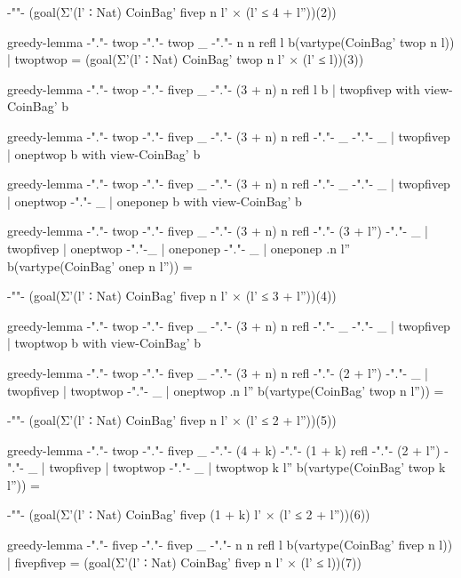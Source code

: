 \begin{sidewaysfigure}
\begin{code}
{-"\hfill"-} (goal(Σ'(l' ∶ Nat) CoinBag' fivep n l' × (l' ≤ 4 + l''))(2))

greedy-lemma {-"."-}  twop   {-"."-}  twop   _    {-"."-}  n                n        refl           l                   b(vartype(CoinBag' twop n l))  | twoptwop = (goal(Σ'(l' ∶ Nat) CoinBag' twop n l' × (l' ≤ l))(3))

greedy-lemma {-"."-}  twop   {-"."-}  fivep  _    {-"."-}  (3 + n)          n        refl           l                   b  | twopfivep  with view-CoinBag' b

greedy-lemma {-"."-}  twop   {-"."-}  fivep  _    {-"."-}  (3 + n)          n        refl  {-"."-}  _          {-"."-}  _  | twopfivep  | oneptwop          b  with view-CoinBag' b

greedy-lemma {-"."-}  twop   {-"."-}  fivep  _    {-"."-}  (3 + n)          n        refl  {-"."-}  _          {-"."-}  _  | twopfivep  | oneptwop {-"."-}  _  | oneponep        b  with view-CoinBag' b

greedy-lemma {-"."-}  twop   {-"."-}  fivep  _    {-"."-}  (3 + n)          n        refl  {-"."-}  (3 + l'')  {-"."-}  _  | twopfivep  | oneptwop {-"."-}_  | oneponep {-"."-}  _  | oneponep {.n} {l''} b(vartype(CoinBag' onep n l'')) =

{-"\hfill"-} (goal(Σ'(l' ∶ Nat) CoinBag' fivep n l' × (l' ≤ 3 + l''))(4))

greedy-lemma {-"."-}  twop   {-"."-}  fivep  _    {-"."-}  (3 + n)          n        refl  {-"."-}  _          {-"."-}  _  | twopfivep  | twoptwop          b  with view-CoinBag' b

greedy-lemma {-"."-}  twop   {-"."-}  fivep  _    {-"."-}  (3 + n)          n        refl  {-"."-}  (2 + l'')  {-"."-}  _  | twopfivep  | twoptwop {-"."-}  _  | oneptwop {.n}  {l''} b(vartype(CoinBag' twop n l'')) =

{-"\hfill"-} (goal(Σ'(l' ∶ Nat) CoinBag' fivep n l' × (l' ≤ 2 + l''))(5))

greedy-lemma {-"."-}  twop   {-"."-}  fivep  _    {-"."-}  (4 + k) {-"."-}  (1 + k)  refl  {-"."-}  (2 + l'')  {-"."-}  _  | twopfivep  | twoptwop {-"."-}  _  | twoptwop {k}   {l''} b(vartype(CoinBag' twop k l'')) =

{-"\hfill"-} (goal(Σ'(l' ∶ Nat) CoinBag' fivep (1 + k) l' × (l' ≤ 2 + l''))(6))

greedy-lemma {-"."-}  fivep  {-"."-}  fivep  _    {-"."-}  n                n        refl           l                   b(vartype(CoinBag' fivep n l))  | fivepfivep = (goal(Σ'(l' ∶ Nat) CoinBag' fivep n l' × (l' ≤ l))(7))
\end{code}
\vskip-10pt
\caption{Cases of |greedy-lemma|, generated semi-automatically by \Agda's interactive case-split mechanism.
Goal types are shown in the interaction points, and the types of some pattern variables are shown in subscript beside them.}
\label{fig:greedy-lemma}
\end{sidewaysfigure}

